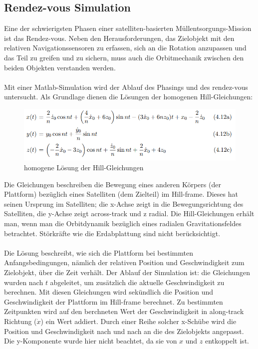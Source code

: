 \documentclass{article}
\begin{document}
\subsection{Rendez-vous Simulation} \label{rendez-vous}
Eine der schwierigsten Phasen einer satelliten-basierten Müllentsorgungs-Mission ist das Rendez-vous. Neben den Herausforderungen, das Zielobjekt mit den relativen Navigationssensoren zu erfassen, sich an die Rotation anzupassen und das Teil zu greifen und zu sichern, muss auch die Orbitmechanik zwischen den beiden Objekten verstanden werden. \\\\
Mit einer Matlab-Simulation wird der Ablauf des Phasings und des rendez-vous untersucht. Als Grundlage dienen die Lösungen der homogenen Hill-Gleichungen:
\begin{figure}[H]
	\centering
	\includegraphics[width=\linewidth]{bilder/Hill.png}
	\caption{homogene Lösung der Hill-Gleichungen}
	\label{Hill}
\end{figure}
\noindent Die Gleichungen beschreiben die Bewegung eines anderen Körpers (der Plattform) bezüglich eines Satelliten (dem Zielteil) im Hill-frame. Dieses hat seinen Ursprung im Satelliten; die x-Achse zeigt in die Bewegungsrichtung des Satelliten, die y-Achse zeigt across-track und z radial. Die Hill-Gleichungen erhält man, wenn man die Orbitdynamik bezüglich eines radialen Gravitationsfeldes betrachtet. Störkräfte wie die Erdabplattung sind nicht berücksichtigt. \\\\
Die Lösung beschreibt, wie sich die Plattform bei bestimmten Anfangsbedingungen, nämlich der relativen Position und Geschwindigkeit zum Zielobjekt, über die Zeit verhält. Der Ablauf der Simulation ist: die Gleichungen wurden nach $t$ abgeleitet, um zusätzlich die aktuelle Geschwindigkeit zu berechnen. Mit diesen Gleichungen wird sekündlich die Position und Geschwindigkeit der Plattform im Hill-frame berechnet. Zu bestimmten Zeitpunkten wird auf den berchneten Wert der Geschwindigkeit in along-track Richtung ($\dot{x}$) ein Wert addiert. Durch einer Reihe solcher x-Schübe wird die Position und Geschwindigkeit nach und nach an die des Zielobjekts angepasst. Die y-Komponente wurde hier nicht beachtet, da sie von $x$ und $z$ entkoppelt ist. \\\\
\end{document}
